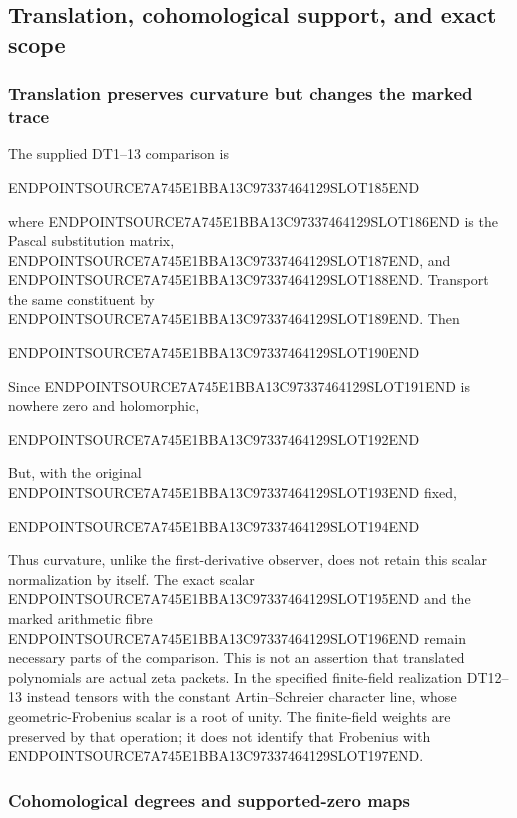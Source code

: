 \subsection{Translation, cohomological support, and exact scope}\label{endpoint-residue_original--translation-cohomological-support-and-exact-scope}

\subsubsection{Translation preserves curvature but changes the marked trace}\label{endpoint-residue_original--translation-preserves-curvature-but-changes-the-marked-trace}

The supplied DT1--13 comparison is

ENDPOINTSOURCE7A745E1BBA13C97337464129SLOT185END

where ENDPOINTSOURCE7A745E1BBA13C97337464129SLOT186END is the Pascal substitution matrix, ENDPOINTSOURCE7A745E1BBA13C97337464129SLOT187END, and ENDPOINTSOURCE7A745E1BBA13C97337464129SLOT188END. Transport the same constituent by ENDPOINTSOURCE7A745E1BBA13C97337464129SLOT189END. Then

ENDPOINTSOURCE7A745E1BBA13C97337464129SLOT190END

Since ENDPOINTSOURCE7A745E1BBA13C97337464129SLOT191END is nowhere zero and holomorphic,

ENDPOINTSOURCE7A745E1BBA13C97337464129SLOT192END

But, with the original ENDPOINTSOURCE7A745E1BBA13C97337464129SLOT193END fixed,

ENDPOINTSOURCE7A745E1BBA13C97337464129SLOT194END

Thus curvature, unlike the first-derivative observer, does not retain this scalar normalization by itself. The exact scalar ENDPOINTSOURCE7A745E1BBA13C97337464129SLOT195END and the marked arithmetic fibre ENDPOINTSOURCE7A745E1BBA13C97337464129SLOT196END remain necessary parts of the comparison. This is not an assertion that translated polynomials are actual zeta packets. In the specified finite-field realization DT12--13 instead tensors with the constant Artin--Schreier character line, whose geometric-Frobenius scalar is a root of unity. The finite-field weights are preserved by that operation; it does not identify that Frobenius with ENDPOINTSOURCE7A745E1BBA13C97337464129SLOT197END.

\subsubsection{Cohomological degrees and supported-zero maps}\label{endpoint-residue_original--cohomological-degrees-and-supported-zero-maps}


